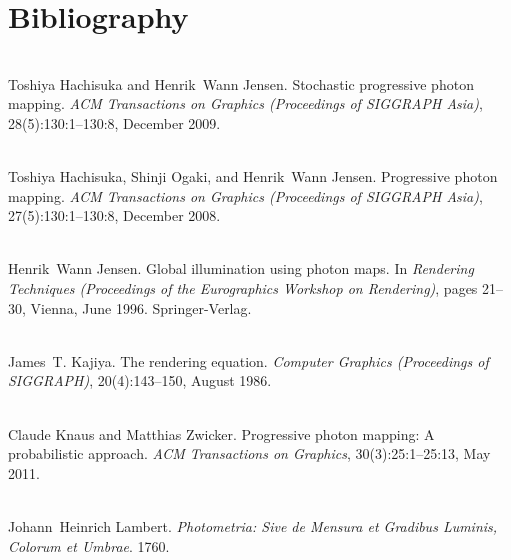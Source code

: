 \chapter{Bibliography}
\hypertarget{citelist}{}\label{citelist}

\begin{DoxyDescription}
\item[\label{citelist_CITEREF_Hachisuka:2009:Stochastic}%
\Hypertarget{citelist_CITEREF_Hachisuka:2009:Stochastic}%
\mbox{[}1\mbox{]}]\hfill \\
Toshiya Hachisuka and Henrik~Wann Jensen. Stochastic progressive photon mapping. {\itshape ACM Transactions on Graphics (Proceedings of SIGGRAPH Asia)}, 28(5)\+:130\+:1--130\+:8, December 2009. 


\item[\label{citelist_CITEREF_Hachisuka:2008:Progressive}%
\Hypertarget{citelist_CITEREF_Hachisuka:2008:Progressive}%
\mbox{[}2\mbox{]}]\hfill \\
Toshiya Hachisuka, Shinji Ogaki, and Henrik~Wann Jensen. Progressive photon mapping. {\itshape ACM Transactions on Graphics (Proceedings of SIGGRAPH Asia)}, 27(5)\+:130\+:1--130\+:8, December 2008. 


\item[\label{citelist_CITEREF_Jensen:1996:Global}%
\Hypertarget{citelist_CITEREF_Jensen:1996:Global}%
\mbox{[}3\mbox{]}]\hfill \\
Henrik~Wann Jensen. Global illumination using photon maps. In {\itshape Rendering Techniques (Proceedings of the Eurographics Workshop on Rendering)}, pages 21--30, Vienna, June 1996. Springer-\/\+Verlag. 


\item[\label{citelist_CITEREF_Kajiya:1986:Rendering}%
\Hypertarget{citelist_CITEREF_Kajiya:1986:Rendering}%
\mbox{[}4\mbox{]}]\hfill \\
James~T. Kajiya. The rendering equation. {\itshape Computer Graphics (Proceedings of SIGGRAPH)}, 20(4)\+:143--150, August 1986. 


\item[\label{citelist_CITEREF_Knaus:2011:Progressive}%
\Hypertarget{citelist_CITEREF_Knaus:2011:Progressive}%
\mbox{[}5\mbox{]}]\hfill \\
Claude Knaus and Matthias Zwicker. Progressive photon mapping\+: A probabilistic approach. {\itshape ACM Transactions on Graphics}, 30(3)\+:25\+:1--25\+:13, May 2011. 


\item[\label{citelist_CITEREF_Lambert:1760:Photometria}%
\Hypertarget{citelist_CITEREF_Lambert:1760:Photometria}%
\mbox{[}6\mbox{]}]\hfill \\
Johann~Heinrich Lambert. {\itshape Photometria\+: Sive de Mensura et Gradibus Luminis, Colorum et Umbrae}. 1760.



\end{DoxyDescription}
